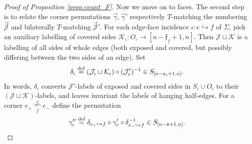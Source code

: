 \documentclass{amsart}
\newcommand{\corner}[1][]{
 \underset{f#1}
 {
  \overset{c#1}{\curvearrowleft}
 }
}
\newcommand{\defeq}{\stackrel{\tn{def}}{=}}
\newcommand{\tn}{\textnormal}
\begin{document}
\begin{proof}[Proof of Proposition \ref{prop:count_F}]
Now we move on to faces. The second step is to relate the corner permutations $\vec\gamma,\vec\gamma'$ respectively $T$-matching the numbering $\vec{\mathcal{J}}$ and bilaterally $T$-matching $\vec{\mathcal{J}}'$. For each edge-face incidence $\iota\colon e\hookrightarrow f$ of $\Sigma$, pick an auxiliary labelling of covered sides $\mathcal{K}_\iota\colon O_\iota\to[n-\mathfrak{f}_f+1,n]$. Then $\mathcal{J}\sqcup\mathcal{K}$ is a labelling of all sides of whole edges (both exposed and covered, but possibly differing between the two sides of an edge). Set
\begin{equation*}
\delta_\iota\defeq(\mathcal{J}_\iota\sqcup\mathcal{K}_\iota)\circ(\mathcal{J}'_e)^{-1}\in S_{[n-\mathfrak{e}_e+1,n]}.
\end{equation*}
In words, $\delta_\iota$ converts $\mathcal{J}'$-labels of exposed and covered sides in $S_\iota\cup O_\iota$ to their $(\mathcal{J}\sqcup\mathcal{K})$-labels, and leaves invariant the labels of hanging half-edges. For a corner $e_+\corner e_-$ define the permutation
\begin{equation*}
\gamma''_c\defeq\delta_{e_+\hookrightarrow f}\circ\gamma'_c\circ\delta_{e_-\hookrightarrow f}^{-1}\in S_{[n-\mathfrak{v}+1,n]}.
\end{equation*}


\end{proof}
\end{document}
